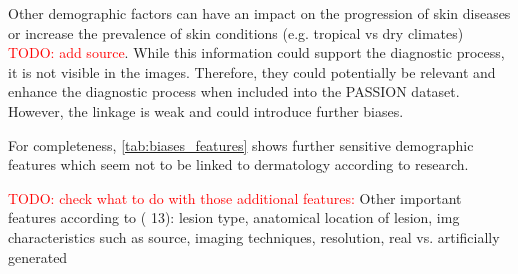 \documentclass[12pt, a4paper, oneside]{book}   	%
\renewcommand{\todo}[1]{\textcolor{red}{TODO: #1}}
\begin{document}
			Other demographic factors can have an impact on the progression of skin diseases or increase the prevalence of skin conditions (e.g. tropical vs dry climates) \todo{add source}. While this information could support the diagnostic process, it is not visible in the images. Therefore, they could potentially be relevant and enhance the diagnostic process when included into the PASSION dataset. However, the linkage is weak and could introduce further biases.
			
			For completeness, \autoref{tab:biases_features} shows further sensitive demographic features which seem not to be linked to dermatology according to research.
			
			
			\todo{check what to do with those additional features:}
			Other important features according to (\autocite{Montoya_2025} 13):
			lesion type, anatomical location of lesion, img characteristics such as source, imaging techniques, resolution, real vs. artificially generated
\end{document}

